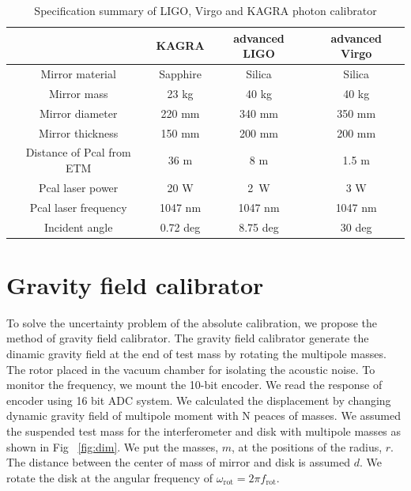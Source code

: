 \documentclass[%
 reprint,
superscriptaddress,
 amsmath,amssymb,
 aps,
]{revtex4-1}
\begin{document}
\begin{table}
\begin{center}
\caption{Specification summary of LIGO, Virgo and KAGRA photon calibrator\label{pcal}}
\footnotesize
\begin{tabular}{cccc}
\hline
& KAGRA& advanced LIGO& advanced Virgo \\
\hline
Mirror material & Sapphire & Silica & Silica \\
 Mirror mass & 23 kg & 40 kg & 40 kg \\
  Mirror diameter & 220 mm & 340 mm & 350 mm \\
    Mirror thickness & 150 mm & 200 mm & 200 mm \\
 Distance of Pcal from ETM & 36 m & 8 m & 1.5 m \\
  Pcal laser power & 20 W & 2~W & 3 W \\
  Pcal laser frequency & 1047 nm & 1047 nm &1047 nm\\
  Incident angle& 0.72 deg & 8.75 deg &30 deg \\
  \hline
\end{tabular}
\end{center}
\end{table}

\section{Gravity field calibrator} \label{sec:Gcal}
To solve the uncertainty problem of the absolute calibration, we propose the method of gravity field calibrator. The gravity field calibrator generate the dinamic gravity field at the end of test mass by rotating the multipole masses. The rotor placed in the vacuum chamber for isolating the acoustic noise. To monitor the frequency, we mount the 10-bit encoder. We read the response of encoder using 16 bit ADC system.
We calculated the displacement by changing dynamic gravity field of multipole moment with N peaces of masses.
We assumed the suspended test mass for the interferometer and disk with multipole masses as shown in Fig ~\ref{fig:dim}.
We put the masses, $m$, at the positions of the radius, $r$. The distance between the center of mass of mirror and disk is assumed $d$.
We rotate the disk at the angular frequency of $\omega_{\mathrm{rot}}=2\pi f_{\mathrm{rot}}$.
\end{document}
